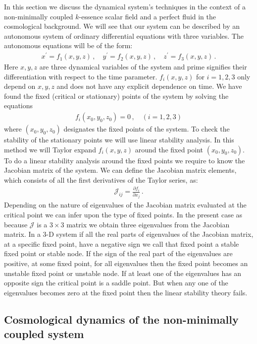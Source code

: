 \documentclass[a4paper,12pt]{article}
\begin{document}
In this section we discuss the dynamical system's techniques in the context of a non-minimally coupled $k$-essence scalar field and a perfect fluid in the cosmological background. We will see that our system can be described by  an autonomous system of ordinary differential equations with three variables. The autonomous equations will be of the form:
%
\begin{eqnarray}
x^{\prime} = f_1(x,y,z)\,, \quad y^{\prime} = f_2(x,y,z)\,, \quad z^{\prime} = f_3(x,y,z)\,.
\nonumber
\end{eqnarray}
%
Here $x,y,z$ are three dynamical variables of the system and prime signifies their differentiation with respect to the time parameter. $f_i(x,y,z)$ for $i=1,2,3$ only depend on $x,y,z$ and does not have any explicit dependence on time. We have found the fixed (critical or stationary) points of the system by solving the equations
%
\begin{eqnarray}
f_i(x_0,y_0,z_0)=0\,,\quad (i=1,2,3)
\nonumber
\end{eqnarray}
where $(x_0,y_0,z_0)$ designates the fixed points of the system. To check the stability of the stationary points we will use linear stability analysis. In this  method we will Taylor expand $f_i(x, y, z)$ around the fixed point $(x_0 , y_0 , z_0)$.  To do a linear stability analysis around the fixed points we require to know the Jacobian matrix of the system. We can define the Jacobian matrix elements, which consists of all the first derivatives of the Taylor series, as:
%
\begin{eqnarray}
\mathcal{J}_{ij} = \frac{\partial f_i}{\partial x_j}\,.
\end{eqnarray}
%
Depending on the nature of eigenvalues of the Jacobian matrix evaluated at the critical point we can infer upon the type of fixed points. In the present case as because ${\mathcal J}$ is a $3\times3$ matrix we obtain three eigenvalues from the Jacobian matrix. In a 3-D system if all the real parts of eigenvalues of the Jacobian matrix, at a specific fixed point, have a negative sign we call that fixed point a stable fixed point or stable node. If the sign of the real part of the eigenvalues are positive, at some fixed point, for all eigenvalues then the fixed point becomes an unstable fixed point or unstable node. If at least one of the eigenvalues has an opposite sign the critical point is a saddle point. But when any one of the eigenvalues becomes zero at the fixed point then the linear stability theory fails. 
\subsection{Cosmological dynamics of the non-minimally coupled system}
	
\end{document}
